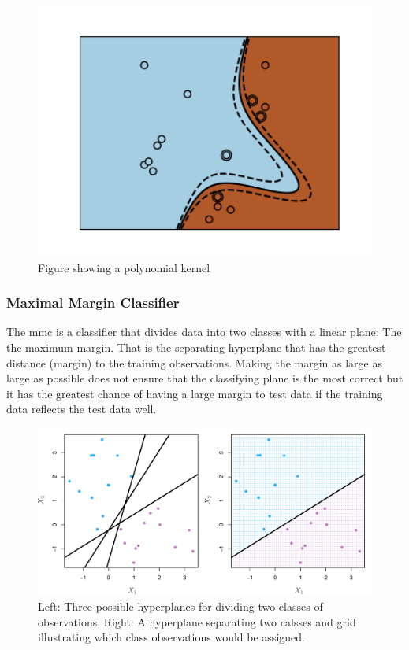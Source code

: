 \documentclass[11pt]{article}
\begin{document}
\begin{figure}[ht]
  \centering
  \includegraphics[width=12cm]{graphics/kernel_poly.png}
  \caption{Figure showing a polynomial kernel}
\end{figure}

\subsubsection{Maximal Margin Classifier}
The \gls{mmc} is a classifier that divides data into two classes with a linear plane: The the maximum margin. That is the separating hyperplane that has the greatest distance (margin) to the training observations. Making the margin as large as large as possible does not ensure that the classifying plane is the most correct but it has the greatest chance of having a large margin to test data if the training data reflects the test data well.\cite{jamesSupportVectorMachines}\cite{HyperplaneSeparationTheorem2021}

\begin{figure}[ht]
  \centering
  \includegraphics[width=12cm]{graphics/9_2.pdf}
  \caption{Left: Three possible hyperplanes for dividing two classes of observations. Right: A hyperplane separating two calsses and grid illustrating which class observations would be assigned.}
\end{figure}
\end{document}
